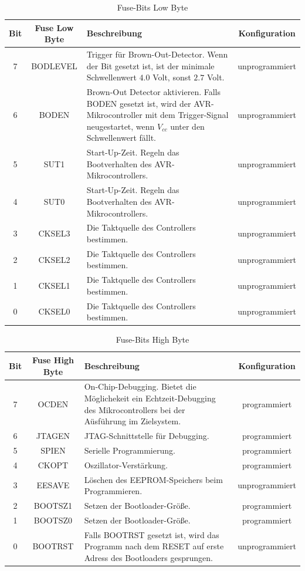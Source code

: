 \begin{table}[htbp]
	\centering
	\begin{tabular}{ |c|c|p{9cm}|c| } \hline
		\textbf{Bit} & \textbf{Fuse Low Byte} & \textbf{Beschreibung} & \textbf{Konfiguration} \\ \hline
		7 & BODLEVEL & Trigger für Brown-Out-Detector\tablefootnote{überwacht die $V_{cc}$ Spannung.}. Wenn der Bit gesetzt ist, ist der minimale Schwellenwert $4.0$ Volt, sonst $2.7$ Volt. & unprogrammiert \\ \hline
		6 & BODEN & Brown-Out Detector aktivieren. Falls BODEN gesetzt ist, wird der AVR-Mikrocontroller mit dem Trigger-Signal neugestartet, wenn $V_{cc}$ unter den Schwellenwert fällt.  & unprogrammiert \\ \hline
		5 & SUT1 & Start-Up-Zeit. Regeln das Bootverhalten des AVR-Mikrocontrollers. & unprogrammiert \\ \hline
		4 & SUT0 & Start-Up-Zeit. Regeln das Bootverhalten des AVR-Mikrocontrollers. & unprogrammiert \\ \hline
		3 & CKSEL3 & Die Taktquelle des Controllers bestimmen. & unprogrammiert \\ \hline
		2 & CKSEL2 & Die Taktquelle des Controllers bestimmen. & unprogrammiert \\ \hline
		1 & CKSEL1 & Die Taktquelle des Controllers bestimmen. & unprogrammiert \\ \hline
		0 & CKSEL0 & Die Taktquelle des Controllers bestimmen. & unprogrammiert \\ \hline
	\end{tabular}
	\caption{Fuse-Bits Low Byte}\label{tab:fuse-low}
\end{table}

\begin{table}[htbp]
	\centering
	\begin{tabular}{ |c|c|p{9cm}|c| } \hline
		\textbf{Bit} & \textbf{Fuse High Byte} & \textbf{Beschreibung} & \textbf{Konfiguration} \\ \hline
		7 & OCDEN & On-Chip-Debugging. Bietet die Möglichekeit ein Echtzeit-Debugging des Mikrocontrollers bei der Aüsführung im Zielsystem. & programmiert \\ \hline
		6 & JTAGEN &  JTAG-Schnittstelle für Debugging. & programmiert \\ \hline
		5 & SPIEN & Serielle Programmierung. & programmiert \\ \hline
		4 & CKOPT & Oszillator-Verstärkung. & programmiert \\ \hline
		3 & EESAVE & Löschen des EEPROM-Speichers beim Programmieren. & unprogrammiert \\ \hline
		2 & BOOTSZ1 & Setzen der Bootloader-Größe. & programmiert \\ \hline
		1 & BOOTSZ0 & Setzen der Bootloader-Größe. & programmiert \\ \hline
		0 & BOOTRST & Falls BOOTRST gesetzt ist, wird das Programm nach dem RESET auf erste Adress des Bootloaders gesprungen. & unprogrammiert \\ \hline
	\end{tabular}
	\caption{Fuse-Bits High Byte}\label{tab:fuse-high}
\end{table}

